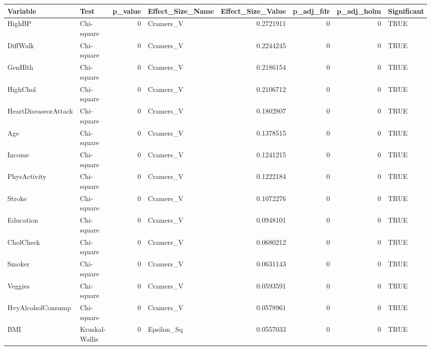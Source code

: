 
\begin{tabular}{llrlrrrl}
\toprule
Variable & Test & p\_value & Effect\_Size\_Name & Effect\_Size\_Value & p\_adj\_fdr & p\_adj\_holm & Significant\\
\midrule
HighBP & Chi-square & 0 & Cramers\_V & 0.2721911 & 0 & 0 & TRUE\\
DiffWalk & Chi-square & 0 & Cramers\_V & 0.2244245 & 0 & 0 & TRUE\\
GenHlth & Chi-square & 0 & Cramers\_V & 0.2186154 & 0 & 0 & TRUE\\
HighChol & Chi-square & 0 & Cramers\_V & 0.2106712 & 0 & 0 & TRUE\\
HeartDiseaseorAttack & Chi-square & 0 & Cramers\_V & 0.1802807 & 0 & 0 & TRUE\\
\addlinespace
Age & Chi-square & 0 & Cramers\_V & 0.1378515 & 0 & 0 & TRUE\\
Income & Chi-square & 0 & Cramers\_V & 0.1241215 & 0 & 0 & TRUE\\
PhysActivity & Chi-square & 0 & Cramers\_V & 0.1222184 & 0 & 0 & TRUE\\
Stroke & Chi-square & 0 & Cramers\_V & 0.1072276 & 0 & 0 & TRUE\\
Education & Chi-square & 0 & Cramers\_V & 0.0948101 & 0 & 0 & TRUE\\
\addlinespace
CholCheck & Chi-square & 0 & Cramers\_V & 0.0680212 & 0 & 0 & TRUE\\
Smoker & Chi-square & 0 & Cramers\_V & 0.0631143 & 0 & 0 & TRUE\\
Veggies & Chi-square & 0 & Cramers\_V & 0.0593591 & 0 & 0 & TRUE\\
HvyAlcoholConsump & Chi-square & 0 & Cramers\_V & 0.0578961 & 0 & 0 & TRUE\\
BMI & Kruskal-Wallis & 0 & Epsilon\_Sq & 0.0557033 & 0 & 0 & TRUE\\
\bottomrule
\end{tabular}
